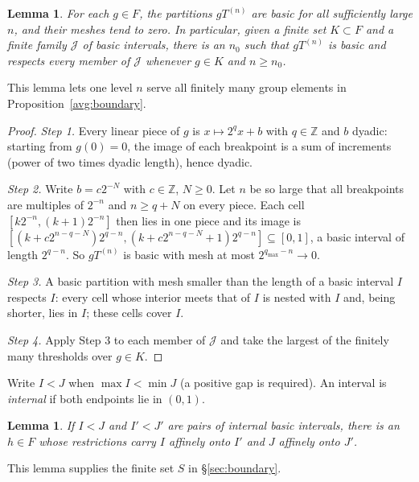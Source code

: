\documentclass[11pt]{article}
\newcommand{\Z}{\mathbb Z}
\newtheorem{lemma}[theorem]{Lemma}
\theoremstyle{definition}
\numberwithin{equation}{section}
\begin{document}
\begin{lemma}\label{dyad:eventual}
For each $g\in F$, the partitions $gT^{(n)}$ are basic for all
sufficiently large $n$, and their meshes tend to zero. In particular,
given a finite set $K\subset F$ and a finite family $\mathcal J$ of
basic intervals, there is an $n_0$ such that $gT^{(n)}$ is basic and
respects every member of $\mathcal J$ whenever $g\in K$ and $n\geq n_0$.
\end{lemma}

This lemma lets one level $n$ serve all finitely many group elements in
Proposition~\ref{avg:boundary}.

\begin{proof}
\emph{Step 1.} Every linear piece of $g$ is $x\mapsto2^qx+b$ with
$q\in\Z$ and $b$ dyadic: starting from $g(0)=0$, the image of each
breakpoint is a sum of increments (power of two times dyadic length),
hence dyadic.

\emph{Step 2.} Write $b=c2^{-N}$ with $c\in\Z$, $N\ge0$. Let $n$ be so
large that all breakpoints are multiples of $2^{-n}$ and $n\ge q+N$ on
every piece. Each cell $[k2^{-n},(k+1)2^{-n}]$ then lies in one piece
and its image is
$[(k+c2^{n-q-N})2^{q-n},(k+c2^{n-q-N}+1)2^{q-n}]\subseteq[0,1]$, a basic
interval of length $2^{q-n}$. So $gT^{(n)}$ is basic with mesh at most
$2^{q_{\max}-n}\to0$.

\emph{Step 3.} A basic partition with mesh smaller than the length of a
basic interval $I$ respects $I$: every cell whose interior meets that of
$I$ is nested with $I$ and, being shorter, lies in $I$; these cells
cover $I$.

\emph{Step 4.} Apply Step 3 to each member of $\mathcal J$ and take the
largest of the finitely many thresholds over $g\in K$.
\end{proof}

Write $I<J$ when $\max I<\min J$ (a positive gap is required). An
interval is \emph{internal} if both endpoints lie in $(0,1)$.

\begin{lemma}\label{dyad:transport}
If $I<J$ and $I'<J'$ are pairs of internal basic intervals, there is
an $h\in F$ whose restrictions carry $I$ affinely onto $I'$ and $J$
affinely onto $J'$.
\end{lemma}

This lemma supplies the finite set $S$ in \S\ref{sec:boundary}.
\end{document}
